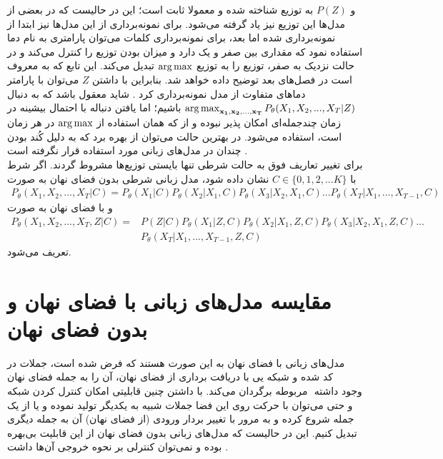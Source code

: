و $P(Z)$ به توزیع
شناخته شده و معمولا ثابت است؛ این در حالیست که در بعضی از مدل‌ها این توزیع نیز یاد گرفته می‌شود. برای نمونه‌برداری از این مدل‌ها نیز ابتدا از \priordist{} نمونه‌برداری شده اما بعد، برای نمونه‌برداری کلمات می‌توان پارامتری به نام دما استفاده نمود که مقداری بین صفر و یک دارد و میزان 
بودن توزیع را کنترل می‌کند و در حالت نزدیک به صفر، توزیع را به توزیع $\operatorname*{arg\,max}$ تبدیل می‌کند. این تابع که به  معروف است در فصل‌های بعد توضیح داده خواهد شد. بنابراین با داشتن $Z$ می‌توان با پارامتر دما‌های متفاوت از مدل نمونه‌برداری کرد \cite{toward}. شاید معقول باشد که به دنبال
$\operatorname*{arg\,max}_{{\bf x_1}, {\bf x_2}, ..., {\bf x_T}} P_\theta(X_1, X_2, ... , X_T|Z)$
باشیم؛ اما یافتن دنباله با احتمال بیشینه در زمان چندجمله‌ای امکان پذیر نبوده و از \greedydecoding{} که همان استفاده از $\operatorname*{arg\,max}$ در هر زمان است، استفاده می‌شود. در بهترین حالت می‌توان از
بهره برد که به دلیل کُند بودن چندان در مدل‌های زبانی مورد استفاده قرار نگرفته است .
\\
برای تغییر تعاریف فوق به حالت شرطی تنها بایستی توزیع‌ها مشروط گردند. اگر شرط با $C \in \{0,1,2,...K\}$ نشان داده شود، مدل زبانی شرطی بدون فضای نهان به صورت
\begin{align}
	P_\theta(X_1, X_2, ... , X_T|C) = P_\theta(X_1|C) P_\theta(X_2|X_1,C) P_\theta(X_3|X_2, X_1,C) ... P_\theta(X_T|X_1, ..., X_{T-1},C)
\end{align}
و با فضای نهان به صورت
\begin{align}
	P_\theta(X_1, X_2, ... , X_T,Z|C) = & P(Z|C) P_\theta(X_1|Z,C) P_\theta(X_2|X_1,Z,C) P_\theta(X_3|X_2, X_1,Z,C) ... \nonumber \\& P_\theta(X_T|X_1, ..., X_{T-1},Z,C)
\end{align}
تعریف می‌شود.
\section{مقایسه مدل‌های زبانی با فضای نهان و بدون فضای نهان} \label{chap1:latent_or_not}
مدل‌های زبانی با فضای نهان به این صورت هستند که فرض شده است، جملات در فضای نهان ‎کد شده و شبکه 
یی 
با دریافت برداری از فضای نهان، آن را به جمله مربوطه برگردان می‌کند. با داشتن چنین قابلیتی امکان کنترل کردن شبکه ‎\decoder{}‎ وجود داشته و حتی می‌توان با حرکت روی این فضا جملات شبیه به یکدیگر تولید نموده و یا از یک جمله شروع کرده و به مرور با تغییر بردار ورودی (از فضای نهان) آن به جمله دیگری تبدیل کنیم. این در حالیست که مدل‌های زبانی بدون فضای نهان از این قابلیت بی‌بهره بوده و نمی‌توان کنترلی بر نحوه خروجی آن‌ها داشت \cite{vae_text}.
